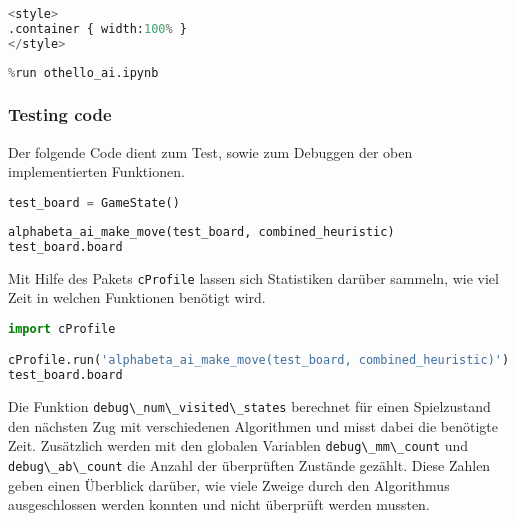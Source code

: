 \begin{lstlisting}[language=Python]
%%HTML
<style>
.container { width:100% }
</style>
\end{lstlisting}

\begin{lstlisting}[language=Python]
%run othello_game.ipynb
%run othello_ai.ipynb
\end{lstlisting}

\hypertarget{testing-code}{%
\subsubsection{Testing code}\label{testing-code}}

Der folgende Code dient zum Test, sowie zum Debuggen der oben
implementierten Funktionen.

\begin{lstlisting}[language=Python]
test_board = GameState()
\end{lstlisting}

\begin{lstlisting}[language=Python]
alphabeta_ai_make_move(test_board, combined_heuristic)
test_board.board
\end{lstlisting}

Mit Hilfe des Pakets \passthrough{\lstinline!cProfile!} lassen sich
Statistiken darüber sammeln, wie viel Zeit in welchen Funktionen
benötigt wird.

\begin{lstlisting}[language=Python]
import cProfile

cProfile.run('alphabeta_ai_make_move(test_board, combined_heuristic)')
test_board.board
\end{lstlisting}

Die Funktion \passthrough{\lstinline!debug\_num\_visited\_states!}
berechnet für einen Spielzustand den nächsten Zug mit verschiedenen
Algorithmen und misst dabei die benötigte Zeit. Zusätzlich werden mit
den globalen Variablen \passthrough{\lstinline!debug\_mm\_count!} und
\passthrough{\lstinline!debug\_ab\_count!} die Anzahl der überprüften
Zustände gezählt. Diese Zahlen geben einen Überblick darüber, wie viele
Zweige durch den Algorithmus ausgeschlossen werden konnten und nicht
überprüft werden mussten.


